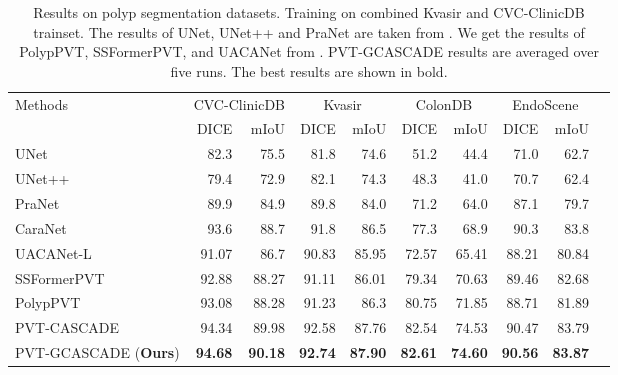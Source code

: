 \documentclass[10pt,twocolumn,letterpaper]{article}
\begin{document}
\begin{table*}[]
\begin{center}
    {\small{
\begin{tabular}{lrrrrrrrrr}
\toprule
\multirow{2}{*}{Methods}        & \multicolumn{2}{c}{CVC-ClinicDB} & \multicolumn{2}{c}{Kvasir} & \multicolumn{2}{c}{ColonDB} & \multicolumn{2}{c}{EndoScene} \\
                               & DICE         & mIoU         & DICE            & mIoU           & DICE         & mIoU        & DICE         & mIoU             \\
\midrule
UNet \cite{ronneberger2015u}     & 82.3          & 75.5         & 81.8       & 74.6      & 51.2       & 44.4 & 71.0       & 62.7            \\
UNet++ \cite{zhou2018unet++}    & 79.4         & 72.9          & 82.1      & 74.3      & 48.3       & 41.0  & 70.7      & 62.4         \\
PraNet \cite{fan2020pranet}    & 89.9         & 84.9         & 89.8       & 84.0      & 71.2      & 64.0    & 87.1       & 79.7       \\
CaraNet \cite{lou2022caranet}    & 93.6         & 88.7         & 91.8       & 86.5      & 77.3      & 68.9  & 90.3       & 83.8      \\
UACANet-L \cite{kim2021uacanet} & 91.07      & 86.7         & 90.83       & 85.95      & 72.57      & 65.41   & 88.21      & 80.84         \\
SSFormerPVT \cite{wang2022stepwise}                   & 92.88          & 88.27         & 91.11       & 86.01      & 79.34       & 70.63     & 89.46       & 82.68          \\
PolypPVT \cite{dong2021polyp}                       & 93.08          & 88.28         & 91.23       & 86.3       & 80.75       & 71.85     & 88.71       & 81.89          \\
PVT-CASCADE \cite{Rahman_2023_WACV}                   & 94.34          & 89.98         & 92.58       & 87.76      & 82.54       & 74.53     &  90.47       & 83.79        \\
\midrule
PVT-GCASCADE (\textbf{Ours})                   &  \textbf{94.68}          & \textbf{90.18}         & \textbf{92.74}       & \textbf{87.90}      & \textbf{82.61}       & \textbf{74.60}     & \textbf{90.56}       & \textbf{83.87}      \\
\bottomrule \end{tabular}
}}
\end{center}
\caption{Results on polyp segmentation datasets. Training on combined Kvasir \cite{jha2020kvasir} and CVC-ClinicDB \cite{bernal2015wm} trainset. The results of UNet, UNet++ and PraNet are taken from \cite{fan2020pranet}. We get the results of PolypPVT, SSFormerPVT, and UACANet from \cite{Rahman_2023_WACV}. PVT-GCASCADE results are averaged over five runs. The best results are shown in bold.} \label{tab:polyp_results}
\end{table*}
\end{document}
